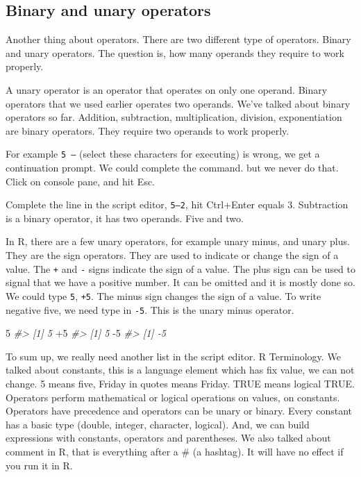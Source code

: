 \documentclass[
]{book}
\newenvironment{Shaded}{\begin{snugshade}}{\end{snugshade}}
\newcommand{\CommentTok}[1]{\textcolor[rgb]{0.56,0.35,0.01}{\textit{#1}}}
\newcommand{\DecValTok}[1]{\textcolor[rgb]{0.00,0.00,0.81}{#1}}
\newcommand{\SpecialCharTok}[1]{\textcolor[rgb]{0.00,0.00,0.00}{#1}}
\begin{document}
\hypertarget{binary-and-unary-operators}{%
\subsection{Binary and unary operators}\label{binary-and-unary-operators}}

Another thing about operators. There are two different type of operators. Binary and unary operators. The question is, how many operands they require to work properly.

A unary operator is an operator that operates on only one operand. Binary operators that we used earlier operates two operands. We've talked about binary operators so far. Addition, subtraction, multiplication, division, exponentiation are binary operators. They require two operands to work properly.

For example \texttt{5\ –} (select these characters for executing) is wrong, we get a continuation prompt. We could complete the command. but we never do that. Click on console pane, and hit Esc.

Complete the line in the script editor, \texttt{5–2}, hit Ctrl+Enter equals 3. Subtraction is a binary operator, it has two operands. Five and two.

In R, there are a few unary operators, for example unary minus, and unary plus. They are the sign operators. They are used to indicate or change the sign of a value. The \texttt{+} and \texttt{-} signs indicate the sign of a value. The plus sign can be used to signal that we have a positive number. It can be omitted and it is mostly done so. We could type \texttt{5}, \texttt{+5}. The minus sign changes the sign of a value. To write negative five, we need type in \texttt{-5}. This is the unary minus operator.

\begin{Shaded}
\begin{Highlighting}[]
\DecValTok{5}
\CommentTok{\#\textgreater{} [1] 5}
\SpecialCharTok{+}\DecValTok{5}
\CommentTok{\#\textgreater{} [1] 5}
\SpecialCharTok{{-}}\DecValTok{5}
\CommentTok{\#\textgreater{} [1] {-}5}
\end{Highlighting}
\end{Shaded}

To sum up, we really need another list in the script editor. R Terminology.
We talked about constants, this is a language element which has fix value, we can not change. 5 means five, Friday in quotes means Friday. TRUE means logical TRUE. Operators perform mathematical or logical operations on values, on constants. Operators have precedence and operators can be unary or binary. Every constant has a basic type (double, integer, character, logical). And, we can build expressions with constants, operators and parentheses.
We also talked about comment in R, that is everything after a \# (a hashtag). It will have no effect if you run it in R.
\end{document}
